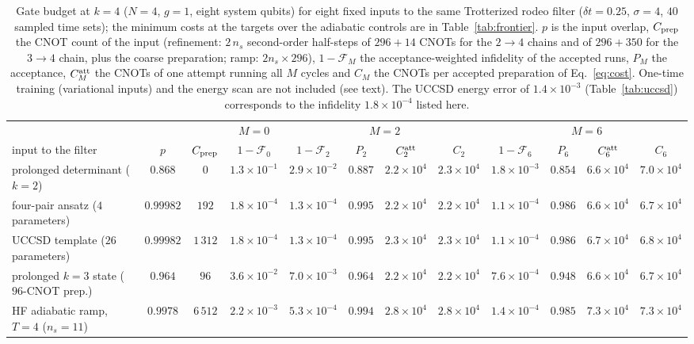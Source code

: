 \documentclass[
  aps,            %
  prc,            %
  reprint,        %
  superscriptaddress,
  floatfix,
  nofootinbib
]{revtex4-2}
\begin{document}
\begin{table}[t]
\caption{\label{tab:depth}Gate budget at $k=4$ ($N=4$, $g=1$, eight system
qubits) for eight fixed inputs to the same Trotterized rodeo filter
($\delta t=0.25$, $\sigma=4$, $40$ sampled time sets); the minimum costs at
the targets over the adiabatic controls are in Table~\ref{tab:frontier}.
$p$ is the input overlap,
$C_{\rm prep}$ the CNOT count of the input (refinement: $2\,n_s$ second-order
half-steps of $296+14$ CNOTs for the $2\to4$ chains and of $296+350$ for the
$3\to4$ chain, plus the coarse preparation; ramp: $2n_s\times296$),
$1-\mathcal F_M$ the acceptance-weighted infidelity of the accepted runs,
$P_M$ the acceptance, $C^{\rm att}_M$ the CNOTs of one attempt running all
$M$ cycles and $C_M$ the CNOTs per accepted preparation of
Eq.~\eqref{eq:cost}.  One-time training (variational inputs) and the energy
scan are not included (see text).  The UCCSD energy error of
$1.4\times10^{-3}$ (Table~\ref{tab:uccsd}) corresponds to the infidelity
$1.8\times10^{-4}$ listed here.}
\scriptsize
\begin{ruledtabular}
\begin{tabular}{lcc c cccc cccc}
 & & & $M=0$ & \multicolumn{4}{c}{$M=2$} & \multicolumn{4}{c}{$M=6$}\\
input to the filter & $p$ & $C_{\rm prep}$ & $1-\mathcal F_0$ & $1-\mathcal F_2$ & $P_2$ & $C^{\rm att}_2$ & $C_2$ & $1-\mathcal F_6$ & $P_6$ & $C^{\rm att}_6$ & $C_6$\\
\colrule
prolonged determinant ($k{=}2$) & $0.868$ & $0$ & $1.3\times10^{-1}$ & $2.9\times10^{-2}$ & $0.887$ & $2.2\times10^{4}$ & $2.3\times10^{4}$ & $1.8\times10^{-3}$ & $0.854$ & $6.6\times10^{4}$ & $7.0\times10^{4}$\\
four-pair ansatz ($4$ parameters) & $0.99982$ & $192$ & $1.8\times10^{-4}$ & $1.3\times10^{-4}$ & $0.995$ & $2.2\times10^{4}$ & $2.2\times10^{4}$ & $1.1\times10^{-4}$ & $0.986$ & $6.6\times10^{4}$ & $6.7\times10^{4}$\\
UCCSD template ($26$ parameters) & $0.99982$ & $1\,312$ & $1.8\times10^{-4}$ & $1.3\times10^{-4}$ & $0.995$ & $2.3\times10^{4}$ & $2.3\times10^{4}$ & $1.1\times10^{-4}$ & $0.986$ & $6.7\times10^{4}$ & $6.8\times10^{4}$\\
prolonged $k{=}3$ state ($96$-CNOT prep.) & $0.964$ & $96$ & $3.6\times10^{-2}$ & $7.0\times10^{-3}$ & $0.964$ & $2.2\times10^{4}$ & $2.2\times10^{4}$ & $7.6\times10^{-4}$ & $0.948$ & $6.6\times10^{4}$ & $6.7\times10^{4}$\\
HF adiabatic ramp, $T{=}4$ ($n_s{=}11$) & $0.9978$ & $6\,512$ & $2.2\times10^{-3}$ & $5.3\times10^{-4}$ & $0.994$ & $2.8\times10^{4}$ & $2.8\times10^{4}$ & $1.4\times10^{-4}$ & $0.985$ & $7.3\times10^{4}$ & $7.3\times10^{4}$\\

\end{tabular}
\end{ruledtabular}
\end{table}
\end{document}

